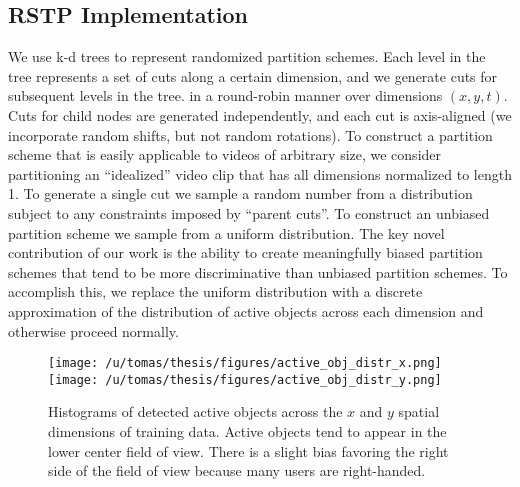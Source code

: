 \documentclass[10pt,twocolumn,letterpaper]{article}
\begin{document}
  \subsection{RSTP Implementation}
	We use k-d trees to represent randomized partition schemes. Each level in the tree
	represents a set of cuts along a certain dimension, and we generate cuts
  for subsequent levels in the tree.
  in a round-robin manner over dimensions $(x, y, t)$. Cuts for child nodes are generated independently, and each cut is axis-aligned
  (we incorporate random shifts, but not random rotations).
  To construct a partition scheme that is easily applicable to videos of
  arbitrary size, we consider
  partitioning an ``idealized'' video clip that has all dimensions normalized
  to length 1. To generate a single cut we sample a random number from a
  distribution subject to any constraints imposed by ``parent cuts''. To
  construct an unbiased partition scheme we sample from a uniform
  distribution.
  The key novel contribution of our work is the ability to create
  meaningfully biased partition schemes that tend to be more discriminative
  than unbiased partition schemes.
  To accomplish this, we replace the uniform distribution with a discrete
  approximation of the distribution of active objects across each dimension
  and otherwise proceed normally.

	\begin{figure}[t]
		\begin{center}
			  \texttt{[image: /u/tomas/thesis/figures/active\_obj\_distr\_x.png]}
			  \texttt{[image: /u/tomas/thesis/figures/active\_obj\_distr\_y.png]}
		\end{center}
		   \caption{Histograms of detected active objects across the $x$ and
       $y$ spatial dimensions of training data. Active objects tend to appear in the lower
     center field of view. There is a slight bias favoring the
   right side of the field of view because many users are right-handed. }
				\label{fig:long}
				\label{fig:onecol}
	\end{figure}
	
\end{document}
